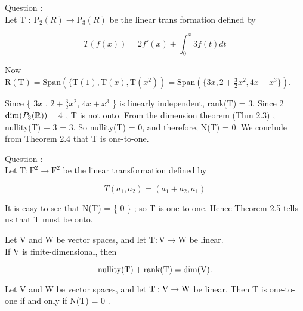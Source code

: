 \begin{example}[11] %
	Question : \\
	Let T : $\mathrm{P}_2(R) \rightarrow  \mathrm{P}_3(R) $ be the linear trans formation defined by 
	
		
	 \[T(f(x)) = 2f'(x) + \int_0^x3 f(t) dt \]
	
		\begin{sol*} 
$ $ \\ 	
Now $\mathrm{R}(\mathrm{T}) = \mathrm{Span}( \{ \mathrm{T}(1), \mathrm{T}(x), \mathrm{T}(x^2 )  ) = \mathrm{Span}( \{ 3x,  2+ \frac{3}{2}  x^2 , 4x + x^3 \} ) $. 

 \noindent Since \{ $3x$ , $ 2 + \frac{3}{2} x^2$, $4x + x^3$ \} is linearly independent, rank($\mathrm{T}$) = 3. Since
2
$\dim(P_3(\mathbb{R})) = 4$ , T is not onto. From the dimension theorem (Thm 2.3) , nullity(T) +
3 = 3. So nullity(T) = 0, and therefore, N(T) = {0}. We conclude from Theorem 2.4 that T is one-to-one.

	\end{sol*}

	\end{example}
\begin{example}[12] %
	 Question : \\ Let $\mathrm{T}: \mathrm{F}^2 \rightarrow \mathrm{F}^2 $ be the linear transformation defined by 
	 
	 \[T(a_1, a_2) = (a_1 + a_2, a_1)\]

	\begin{sol*} 
$ $ \\
		It is easy to see that N(T) = \{ 0 \} ; so T is one-to-one. Hence Theorem 2.5 tells us that T must be onto. 
	\end{sol*}

\end{example}

\begin{thm*}
$ $ \\	
Let V and W be vector spaces,
and let $ \mathrm{T} : \mathrm{V}  \rightarrow  \mathrm{W} $ be linear. \\ If V is finite-dimensional, then
 
 
 \[\rm	nullity(T) + rank(T) = dim(V).\]


\end{thm*}

\begin{thm*}[2.4]
$ $ \\	Let V and W be vector spaces, and let $\rm T: V  \rightarrow  W$ be
linear. Then T is one-to-one if and only if N(T) = {0 }.

\end{thm*}

